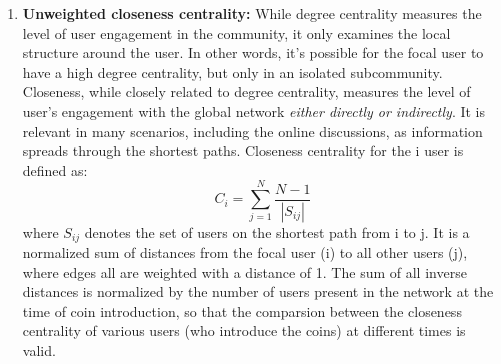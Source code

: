 \begin{enumerate}[topsep=0pt,itemsep=-0.5ex,partopsep=1ex,parsep=1ex]
  \item \textbf{Unweighted closeness centrality:} While degree centrality measures the level of user engagement in the community, it only examines the local structure around the user. In other words, it's possible for the focal user to have a high degree centrality, but only in an isolated subcommunity. Closeness, while closely related to degree centrality, measures the level of user's engagement with the global network \textit{either directly or indirectly}. It is relevant in many scenarios, including the online discussions, as information spreads through the shortest paths. Closeness centrality for the i user is defined as:
  \begin{equation}
    C_{i} = \sum_{j=1}^{N} \frac{N-1}{|S_{ij}|}
  \end{equation}
  where $S_{ij}$ denotes the set of users on the shortest path from i to j. It is a normalized sum of distances from the focal user (i) to all other users (j), where edges all are weighted with a distance of 1. The sum of all inverse distances is normalized by the number of users present in the network at the time of coin introduction, so that the comparsion between the closeness centrality of various users (who introduce the coins) at different times  is valid. 
  

\end{enumerate}
